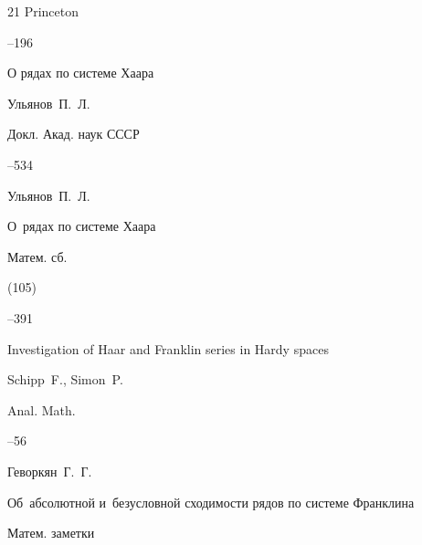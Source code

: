 \begin{thebibliography}{21}
\publaddr Princeton 


–196






\paper О рядах по системе Хаара

\by Ульянов~П.~Л.

\jour Докл. Акад. наук СССР 




--534





\by Ульянов~П.~Л. 

\paper О~рядах по системе Хаара

\jour Матем. сб.


(105)


--391







\paper  Investigation of Haar and Franklin series in Hardy spaces 

\by Schipp~F., Simon~P. 

\jour Anal. Math. 




--56





\by Геворкян~Г.~Г.

\paper Об~абсолютной и~безусловной сходимости рядов по системе Франклина

\jour Матем. заметки


\end{thebibliography}
